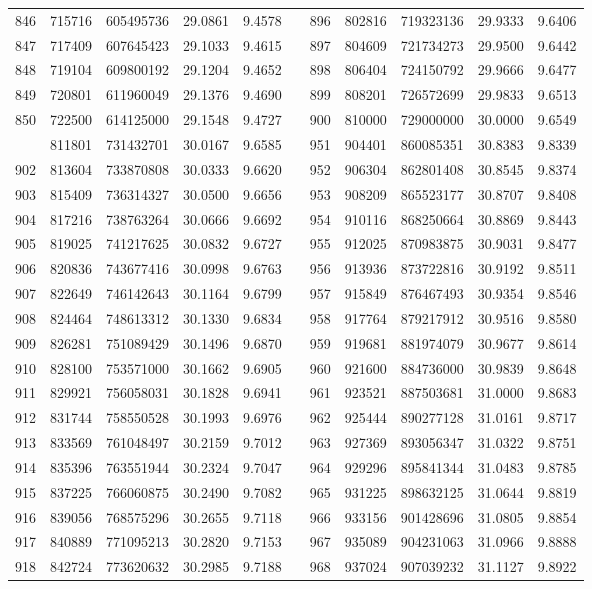 \begin{longtable}{rrrrrrrrrrr}
846&715716&605495736&29.0861&9.4578&&896&802816&719323136&29.9333&9.6406\\
847&717409&607645423&29.1033&9.4615&&897&804609&721734273&29.9500&9.6442\\
848&719104&609800192&29.1204&9.4652&&898&806404&724150792&29.9666&9.6477\\
849&720801&611960049&29.1376&9.4690&&899&808201&726572699&29.9833&9.6513\\
850&722500&614125000&29.1548&9.4727&&900&810000&729000000&30.0000&9.6549\\
\newpage
901&811801&731432701&30.0167&9.6585&&951&904401&860085351&30.8383&9.8339\\
902&813604&733870808&30.0333&9.6620&&952&906304&862801408&30.8545&9.8374\\
903&815409&736314327&30.0500&9.6656&&953&908209&865523177&30.8707&9.8408\\
904&817216&738763264&30.0666&9.6692&&954&910116&868250664&30.8869&9.8443\\
905&819025&741217625&30.0832&9.6727&&955&912025&870983875&30.9031&9.8477\\
906&820836&743677416&30.0998&9.6763&&956&913936&873722816&30.9192&9.8511\\
907&822649&746142643&30.1164&9.6799&&957&915849&876467493&30.9354&9.8546\\
908&824464&748613312&30.1330&9.6834&&958&917764&879217912&30.9516&9.8580\\
909&826281&751089429&30.1496&9.6870&&959&919681&881974079&30.9677&9.8614\\
910&828100&753571000&30.1662&9.6905&&960&921600&884736000&30.9839&9.8648\\
911&829921&756058031&30.1828&9.6941&&961&923521&887503681&31.0000&9.8683\\
912&831744&758550528&30.1993&9.6976&&962&925444&890277128&31.0161&9.8717\\
913&833569&761048497&30.2159&9.7012&&963&927369&893056347&31.0322&9.8751\\
914&835396&763551944&30.2324&9.7047&&964&929296&895841344&31.0483&9.8785\\
915&837225&766060875&30.2490&9.7082&&965&931225&898632125&31.0644&9.8819\\
916&839056&768575296&30.2655&9.7118&&966&933156&901428696&31.0805&9.8854\\
917&840889&771095213&30.2820&9.7153&&967&935089&904231063&31.0966&9.8888\\
918&842724&773620632&30.2985&9.7188&&968&937024&907039232&31.1127&9.8922\\

\end{longtable}
